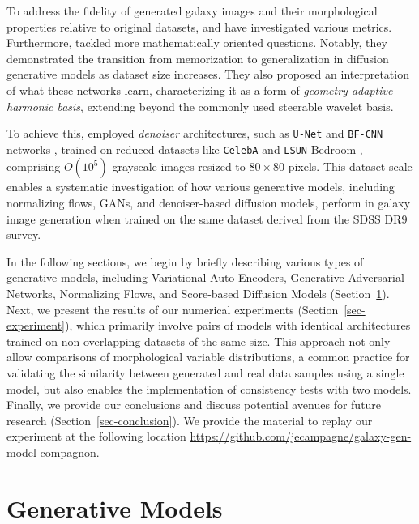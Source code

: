\documentclass[fleqn,usenatbib]{mnras}
\begin{document}
To address the fidelity of generated galaxy images and their morphological properties relative to original datasets, \cite{HACKSTEIN2023100685} and \cite{janulewicz2024assessing} have investigated various metrics. Furthermore, \cite{kadkhodaie2024generalization} tackled more mathematically oriented questions. Notably, they demonstrated the transition from memorization to generalization in diffusion generative models as dataset size increases. They also proposed an interpretation of what these networks learn, characterizing it as a form of \textit{geometry-adaptive harmonic basis}, extending beyond the commonly used {steerable wavelet basis}. 

To achieve this, \cite{kadkhodaie2024generalization} employed \textit{denoiser} architectures, such as \texttt{U-Net} \citep{ronneberger2015u} and \texttt{BF-CNN} networks \citep{Mohan2020Robust}, trained on reduced datasets like \texttt{CelebA} \citep{Liu2015} and \texttt{LSUN} Bedroom \citep{Yu2015}, comprising $O(10^5)$ grayscale images resized to $80 \times 80$ pixels.  This dataset scale enables a systematic investigation of how various generative models, including normalizing flows, GANs, and denoiser-based diffusion models, perform in galaxy image generation when trained on the same dataset derived from the SDSS {\color{red} DR9} survey. 

In the following sections, we begin by briefly describing various types of generative models, including Variational Auto-Encoders, Generative Adversarial Networks, Normalizing Flows, and Score-based Diffusion Models (Section~\ref{sec-generative-models}). Next, we present the results of our numerical experiments (Section~\ref{sec-experiment}), which primarily involve pairs of models with identical architectures trained on non-overlapping datasets of the same size. This approach not only allow comparisons of morphological variable distributions, a common practice for validating the similarity between generated and real data samples using a single model, but also enables the implementation of consistency tests with two models. Finally, we provide our conclusions and discuss potential avenues for future research (Section~\ref{sec-conclusion}). We provide the material to replay our experiment at the following location \url{https://github.com/jecampagne/galaxy-gen-model-compagnon}.
%
\section{Generative Models}
\label{sec-generative-models}
\end{document}
